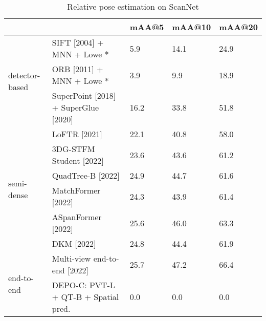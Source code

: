 \begin{table}[h!]
\centering
\caption{Relative pose estimation on ScanNet}
\label{tab:scannet}
\begin{tabular}{lllll}
\toprule
 &  & mAA@5 & mAA@10 & mAA@20 \\
\midrule
\multirow[c]{3}{*}{detector-based} & SIFT [2004] \cite{lowe2004distinctive} + MNN + Lowe * & {\cellcolor[HTML]{F67F4B}} \color[HTML]{F1F1F1} 5.9 & {\cellcolor[HTML]{FDAD60}} \color[HTML]{000000} 14.1 & {\cellcolor[HTML]{FED27F}} \color[HTML]{000000} 24.9 \\
 & ORB [2011] \cite{rublee2011orb} + MNN + Lowe * & {\cellcolor[HTML]{E54E35}} \color[HTML]{F1F1F1} 3.9 & {\cellcolor[HTML]{F57245}} \color[HTML]{F1F1F1} 9.9 & {\cellcolor[HTML]{FBA35C}} \color[HTML]{000000} 18.9 \\
 & SuperPoint [2018] \cite{detone2018superpoint} + SuperGlue [2020] \cite{sarlin2020superglue} & {\cellcolor[HTML]{CBE982}} \color[HTML]{000000} 16.2 & {\cellcolor[HTML]{9BD469}} \color[HTML]{000000} 33.8 & {\cellcolor[HTML]{73C264}} \color[HTML]{000000} 51.8 \\
\cline{1-5}
\multirow[c]{6}{*}{semi-dense} & LoFTR [2021] \cite{sun2021loftr} & {\cellcolor[HTML]{39A758}} \color[HTML]{F1F1F1} 22.1 & {\cellcolor[HTML]{33A456}} \color[HTML]{F1F1F1} 40.8 & {\cellcolor[HTML]{2DA155}} \color[HTML]{F1F1F1} 58.0 \\
 & 3DG-STFM Student [2022] \cite{mao20223dg} & {\cellcolor[HTML]{148E4B}} \color[HTML]{F1F1F1} 23.6 & {\cellcolor[HTML]{138C4A}} \color[HTML]{F1F1F1} 43.6 & {\cellcolor[HTML]{148E4B}} \color[HTML]{F1F1F1} 61.2 \\
 & QuadTree-B [2022] \cite{tang2022quadtree} & {\cellcolor[HTML]{07753E}} \color[HTML]{F1F1F1} 24.9 & {\cellcolor[HTML]{0D8044}} \color[HTML]{F1F1F1} 44.7 & {\cellcolor[HTML]{128A49}} \color[HTML]{F1F1F1} 61.6 \\
 & MatchFormer [2022] \cite{wang2022matchformer} & {\cellcolor[HTML]{0D8044}} \color[HTML]{F1F1F1} 24.3 & {\cellcolor[HTML]{118848}} \color[HTML]{F1F1F1} 43.9 & {\cellcolor[HTML]{138C4A}} \color[HTML]{F1F1F1} 61.4 \\
 & ASpanFormer [2022] \cite{chen2022aspanformer} & {\cellcolor[HTML]{006837}} \color[HTML]{F1F1F1} 25.6 & {\cellcolor[HTML]{06733D}} \color[HTML]{F1F1F1} 46.0 & {\cellcolor[HTML]{0B7D42}} \color[HTML]{F1F1F1} 63.3 \\
 & DKM [2022] \cite{edstedt2022deep} & {\cellcolor[HTML]{08773F}} \color[HTML]{F1F1F1} 24.8 & {\cellcolor[HTML]{0F8446}} \color[HTML]{F1F1F1} 44.4 & {\cellcolor[HTML]{118848}} \color[HTML]{F1F1F1} 61.9 \\
\cline{1-5}
\multirow[c]{2}{*}{end-to-end} & Multi-view end-to-end [2022] \cite{roessle2022end2end} & {\cellcolor[HTML]{006837}} \color[HTML]{F1F1F1} 25.7 & {\cellcolor[HTML]{006837}} \color[HTML]{F1F1F1} 47.2 & {\cellcolor[HTML]{006837}} \color[HTML]{F1F1F1} 66.4 \\
 & DEPO-C: PVT-L + QT-B + Spatial pred. & {\cellcolor[HTML]{A50026}} \color[HTML]{F1F1F1} 0.0 & {\cellcolor[HTML]{A50026}} \color[HTML]{F1F1F1} 0.0 & {\cellcolor[HTML]{A50026}} \color[HTML]{F1F1F1} 0.0 \\
\cline{1-5}
\bottomrule
\end{tabular}
\end{table}
